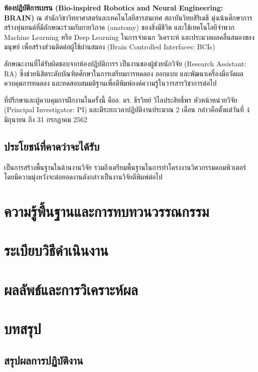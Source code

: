 \documentclass[16pt,a4]{internshipreport}
\begin{document}
\textbf{ห้องปฏิบัติการเบรน (Bio-inspired Robotics and Neural Engineering: BRAIN)}
ณ สำนักวิชาวิทยาศาสตร์และเทคโนโลยีสารสนเทศ สถาบันวิทยสิริเมธี มุ่งเน้นศึกษาการสร้างหุ่นยนต์ที่มีลักษณะร่วมกับกายวิภาค (anatomy) ของสิ่งมีชีวิต และใช้เทคโนโลยีจำพวก Machine Learning หรือ Deep Learning ในการจำแนก วิเคราะห์ และประมวลผลคลื่นสมองของมนุษย์ เพื่อสร้างส่วนติดต่อผู้ใช้ผ่านสมอง (Brain Controlled Interfaces: BCIs)

ลักษณะงานที่ได้รับผิดชอบจากห้องปฏิบัติการฯ เป็นงานของผู้ช่วยนักวิจัย (Research Assistant: RA) ซึ่งช่วยนิสิตระดับบัณฑิตศึกษาในการเตรียมการทดลอง ออกแบบ และพัฒนาเครื่องมือวัดผล ควบคุมการทดลอง และทดสอบสมมติฐานเพื่อตีพิมพ์องค์ความรู้ในวารสารวิชาการต่อไป

ที่ปรึกษาและผู้ควบคุมการฝึกงานในครั้งนี้ คืออ. ดร. ธีรวิทย์ วิไลประสิทธิ์พร หัวหน้าหน่วยวิจัย (Principal Investigator: PI) และมีระยะเวลาปฏิบัติงานประมาณ 2 เดือน กล่าวคือตั้งแต่วันที่ 4 มิถุนายน ถึง 31 กรกฎาคม 2562

\section{ประโยชน์ที่คาดว่าจะได้รับ}
เป็นการสร้างพื้นฐานในด้านงานวิจัย รวมถึงเตรียมพื้นฐานในการทำโครงงานวิศวกรรมคอมพิวเตอร์ โดยมีความมุ่งหวังจะต่อยอดงานดังกล่าวเป็นงานวิจัยตีพิมพ์ต่อไป

\chapter{ความรู้พื้นฐานและการทบทวนวรรณกรรม}




\chapter{ระเบียบวิธีดำเนินงาน}


\chapter{ผลลัพธ์และการวิเคราะห์ผล}


\chapter{บทสรุป}

\section{สรุปผลการปฏิบัติงาน}
\end{document}
